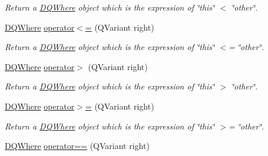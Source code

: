 \begin{DoxyCompactItemize}
\begin{DoxyCompactList}\small\item\em Return a \hyperlink{classDQWhere}{DQWhere} object which is the expression of \char`\"{}this\char`\"{} $<$ \char`\"{}other\char`\"{}. \item\end{DoxyCompactList}\item 
\hypertarget{classDQWhere_a301983e28e59793e68aef86787d12b7e}{
\hyperlink{classDQWhere}{DQWhere} \hyperlink{classDQWhere_a301983e28e59793e68aef86787d12b7e}{operator$<$=} (QVariant right)}
\label{classDQWhere_a301983e28e59793e68aef86787d12b7e}

\begin{DoxyCompactList}\small\item\em Return a \hyperlink{classDQWhere}{DQWhere} object which is the expression of \char`\"{}this\char`\"{} $<$= \char`\"{}other\char`\"{}. \item\end{DoxyCompactList}\item 
\hypertarget{classDQWhere_a02da0c9d14ab443e7adfc0c68c283767}{
\hyperlink{classDQWhere}{DQWhere} \hyperlink{classDQWhere_a02da0c9d14ab443e7adfc0c68c283767}{operator$>$} (QVariant right)}
\label{classDQWhere_a02da0c9d14ab443e7adfc0c68c283767}

\begin{DoxyCompactList}\small\item\em Return a \hyperlink{classDQWhere}{DQWhere} object which is the expression of \char`\"{}this\char`\"{} $>$ \char`\"{}other\char`\"{}. \item\end{DoxyCompactList}\item 
\hypertarget{classDQWhere_a9228ad01c4181dcb8ffcd081d82e11f9}{
\hyperlink{classDQWhere}{DQWhere} \hyperlink{classDQWhere_a9228ad01c4181dcb8ffcd081d82e11f9}{operator$>$=} (QVariant right)}
\label{classDQWhere_a9228ad01c4181dcb8ffcd081d82e11f9}

\begin{DoxyCompactList}\small\item\em Return a \hyperlink{classDQWhere}{DQWhere} object which is the expression of \char`\"{}this\char`\"{} $>$= \char`\"{}other\char`\"{}. \item\end{DoxyCompactList}\item 
\hypertarget{classDQWhere_a08f5de15a195f6a3be2e07f8bb8d7aa8}{
\hyperlink{classDQWhere}{DQWhere} \hyperlink{classDQWhere_a08f5de15a195f6a3be2e07f8bb8d7aa8}{operator==} (QVariant right)}
\label{classDQWhere_a08f5de15a195f6a3be2e07f8bb8d7aa8}


\end{DoxyCompactItemize}
